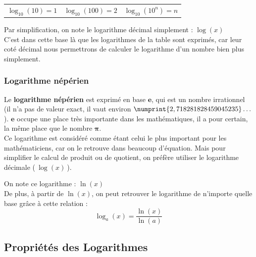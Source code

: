 \documentclass[a4paper, twoside]{article}
\begin{document}
		\begin{center}
		
		\begin{large}
		\begin{tabular}{c|c|c}
			$ \log_{10} (10) = 1 $ \hspace{1cm} &
			\hspace{1cm} $ \log_{10} (100) = 2 $ \hspace{1cm} &
			\hspace{1cm} $ \log_{10} (10^{n}) = n $ \\
		\end{tabular}
		\end{large}
		\end{center}

		Par simplification, on note le logarithme décimal simplement : {\large $ \log(x) $}\\
		
		C'est dans cette base là que les logarithmes de la table sont exprimés, car leur coté décimal nous permettrons de calculer le logarithme d'un nombre bien plus simplement.

	\subsubsection*{Logarithme népérien}

		Le \textbf{logarithme népérien} est exprimé en base $\mathbf{e}$, qui est un nombre irrationnel (il n'a pas de valeur exact, il vaut environ $\numprint{2,718281828459045235}\dots$). $\mathbf{e}$ occupe une place très importante dans les mathématiques, il a pour certain, la même place que le nombre $\mathbf{\pi}$.\\
		
		Ce logarithme est considéré comme étant celui le plus important pour les mathématiciens, car on le retrouve dans beaucoup d'équation. Mais pour simplifier le calcul de produit ou de quotient, on préfère utiliser le logarithme décimale ($~\log (x)~$).
		
		On note ce logarithme : {\large $ \ln (x) $}\\
		
		De plus, à partir de $ \ln (x) $, on peut retrouver le logarithme de n'importe quelle base grâce à cette relation : $$ \log_a (x) = \frac{\ln (x)}{\ln (a)} $$

	\newpage

	\subsection{Propriétés des Logarithmes}
\end{document}
